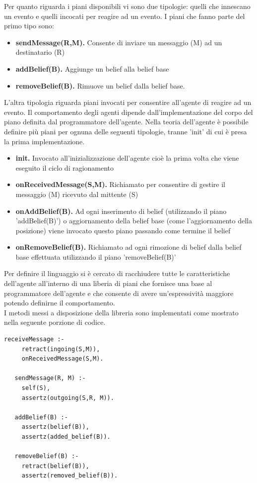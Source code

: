 \documentclass[12pt,a4paper,openright,twoside]{report}
\begin{document}
Per quanto riguarda i piani disponibili vi sono due tipologie: quelli che innescano un evento e quelli incocati per reagire ad un evento.
I piani che fanno parte del primo tipo sono:
\begin{itemize}
   \item \textbf{sendMessage(R,M).} Consente di inviare un messaggio (M) ad un destinatario (R)
   \item \textbf{addBelief(B).} Aggiunge un belief alla belief base
   \item \textbf{removeBelief(B).} Rimuove un belief dalla belief base.
\end{itemize}
L'altra tipologia riguarda piani invocati per consentire all'agente di reagire ad un evento. Il comportamento degli agenti dipende dall'implementazione del corpo del piano definita dal programmatore dell'agente. Nella teoria dell'agente \`e possibile definire pi\`u piani per ognuna delle seguenti tipologie, tranne 'init' di cui \`e presa la prima implementazione.
\begin{itemize}
   \item \textbf{init.} Invocato all'inizializzazione dell'agente cio\`e la prima volta che viene eseguito il ciclo di ragionamento
   \item \textbf{onReceivedMessage(S,M).} Richiamato per consentire di gestire il messaggio (M) ricevuto dal mittente (S)
   \item \textbf{onAddBelief(B).} Ad ogni inserimento di belief (utilizzando il piano 'addBelief(B)') o aggiornamento della belief base (come l'aggiornamento della posizione) viene invocato questo piano passando come termine il belief
   \item \textbf{onRemoveBelief(B).} Richiamato ad ogni rimozione di belief dalla belief base effettuata utilizzando il piano 'removeBelief(B)'
\end{itemize}

Per definire il linguaggio si \`e cercato di racchiudere tutte le caratteristiche dell'agente all'interno di una liberia di piani che fornisce una base al programmatore dell'agente e che consente di avere un'espressivit\`a maggiore potendo definirne il comportamento.
\\
I metodi messi a disposizione della libreria sono implementati come mostrato nella seguente porzione di codice.
\medskip
\begin{lstlisting}[firstnumber=1,label={lst:LibreriaAgenti},caption={Libreria agenti}]
   receiveMessage :-
     retract(ingoing(S,M)),
     onReceivedMessage(S,M).

   sendMessage(R, M) :-
     self(S),
     assertz(outgoing(S,R, M)).

   addBelief(B) :-
     assertz(belief(B)),
     assertz(added_belief(B)).

   removeBelief(B) :-
     retract(belief(B)),
     assertz(removed_belief(B)).
\end{lstlisting}
\end{document}
